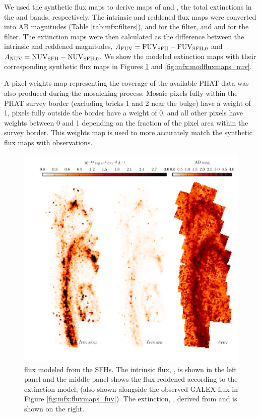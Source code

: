 We used the synthetic flux maps to derive maps of \afuv{} and \anuv{}, the
total extinctions in the \fuv{} and \nuv{} bands, respectively. The intrinsic
and reddened flux maps were converted into AB magnitudes (Table
\ref{tab:mfx:filters}), \fuvsfhz{} and \fuvsfh{} for the \fuv{} filter, and
\nuvsfhz{} and \nuvsfh{} for the \nuv{} filter. The extinction maps were then
calculated as the difference between the intrinsic and reddened magnitudes,
$A_{\mathrm{FUV}} = \mathrm{FUV}_{\mathrm{SFH}} - \mathrm{FUV}_{\mathrm{SFH},0}$ and $A_{\mathrm{NUV}} = \mathrm{NUV}_{\mathrm{SFH}} - \mathrm{NUV}_{\mathrm{SFH},0}$. We show the
modeled extinction maps with their corresponding synthetic flux maps in Figures
\ref{fig:mfx:modfluxmaps_fuv} and \ref{fig:mfx:modfluxmaps_nuv}.

A pixel weights map representing the coverage of the available PHAT data was
also produced during the mosaicking process. Mosaic pixels fully within the
PHAT survey border (excluding bricks 1 and 2 near the bulge) have a weight of
1, pixels fully outside the border have a weight of 0, and all other pixels
have weights between 0 and 1 depending on the fraction of the pixel area within
the survey border. This weights map is used to more accurately match the
synthetic flux maps with observations.


\begin{figure}
\centering
\includegraphics[width=\textwidth]{m31flux-figures/modfluxmaps_fuv.pdf}
\caption[\fuv{} flux map modeled from the SFHs.]{\fuv{} flux modeled from the SFHs.
    The intrinsic flux, \ffuvsfhz{}, is shown in the left panel and the middle
    panel shows the flux reddened according to the extinction model, \ffuvsfh{}
    (also shown alongside the observed GALEX \fuv{} flux in Figure
    \ref{fig:mfx:fluxmaps_fuv}). The \fuv{} extinction, \afuv{}, derived from
    \ffuvsfhz{} and \ffuvsfh{} is shown on the right.
}
\label{fig:mfx:modfluxmaps_fuv}
\end{figure}


